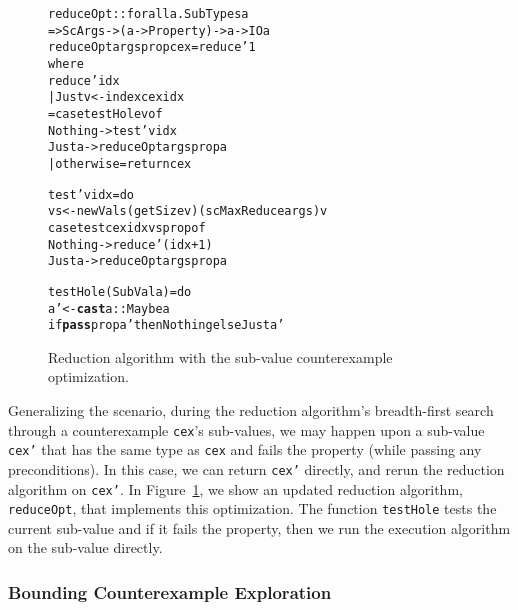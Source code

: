 \documentclass{sigplanconf}
\newenvironment{code}{\begin{alltt}\footnotesize}{\end{alltt}}
\newcommand{\ttp}[1]{\texttt{#1}}
\newcommand{\undef}[1]{{\bf #1}}
\begin{document}

\begin{figure}
\begin{code}
reduceOpt :: forall a . SubTypes a
  => ScArgs -> (a -> Property) -> a -> IO a
reduceOpt args prop cex = reduce' 1
  where
  reduce' idx
    | Just v <- index cex idx
    = case testHole v of
        Nothing -> test' v idx
        Just a  -> reduceOpt args prop a
    | otherwise = return cex

  test' v idx = do
    vs <- newVals (getSize v) (scMaxReduce args) v
    case test cex idx vs prop of
      Nothing -> reduce' (idx+1)
      Just a  -> reduceOpt args prop a

  testHole (SubVal a) = do
    a' <- \undef{cast} a :: Maybe a
    if \undef{pass} prop a' then Nothing else Just a'
\end{code}
  \caption{Reduction algorithm with the sub-value counterexample optimization.}
  \label{fig:reduce0}
\end{figure}

Generalizing the scenario, during the reduction algorithm's breadth-first
search through a counterexample \ttp{cex}'s sub-values, we may happen upon a
sub-value \ttp{cex'} that has the same type as \ttp{cex} and fails the property
(while passing any preconditions).  In this case, we can return \ttp{cex'}
directly, and rerun the reduction algorithm on \ttp{cex'}.  In
Figure~\ref{fig:reduce0}, we show an updated reduction algorithm, \ttp{reduceOpt},
that implements this optimization.  The function \ttp{testHole} tests the
current sub-value and if it fails the property, then we run the execution
algorithm on the sub-value directly.


\subsubsection{Bounding Counterexample Exploration}
\end{document}
